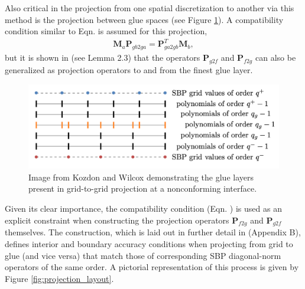 Also critical in the projection from one spatial discretization to another via this
method is the projection between glue spaces (see Figure \ref{fig:glue_layers}). A
compatibility condition similar to Eqn.  is assumed for this projection,
\begin{align}
	\pmb{M}_{a}\pmb{P}_{gb2ga} = \pmb{P}_{ga2gb}^{T}\pmb{M}_{b}, \label{eq:compat_glues}
\end{align}
but it is shown in \cite{kozdon2016stable} (see Lemma 2.3) that the operators $\pmb{P}_{g2f}$ and
$\pmb{P}_{f2g}$ can also be generalized as projection operators to and from the finest
glue layer.
\begin{figure}
\centering
\includegraphics[width=0.9\linewidth,trim=4 4 4 4,clip]{figures/glue_layers.png}
\caption{Image from Kozdon and Wilcox \cite{kozdon2016stable} demonstrating the glue
         layers present in grid-to-grid projection at a nonconforming interface.}
\label{fig:glue_layers}
\end{figure}
Given its clear importance, the compatibility condition (Eqn. ) is used as an explicit
constraint when constructing the projection operators $\pmb{P}_{f2g}$ and $\pmb{P}_{g2f}$
themselves. The construction, which is laid out in further detail in \cite{kozdon2016stable} (Appendix B),
defines interior and boundary accuracy conditions when projecting from grid to glue
(and vice versa) that match those of corresponding SBP diagonal-norm operators of the
same order. A pictorial representation of this process is given by Figure \ref{fig:projection_layout}.
